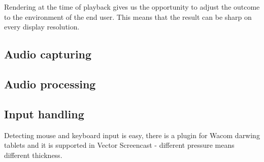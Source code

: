 Rendering at the time of playback gives us the opportunity to adjust the outcome to the environment of the end user. This means that the result can be sharp on every display resolution.


\subsection{Audio capturing}

\subsection{Audio processing}








\subsection{Input handling}
Detecting mouse and keyboard input is easy, there is a plugin for Wacom darwing tablets and it is supported in Vector Screencast - different pressure means different thickness.